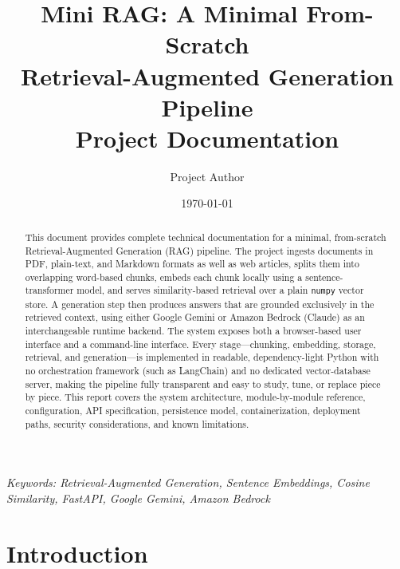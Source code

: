 \documentclass[11pt,a4paper]{article}
\title{\textbf{Mini RAG: A Minimal From-Scratch\\ Retrieval-Augmented Generation Pipeline}\\[4pt]
\large Project Documentation}
\author{Project Author}
\date{\today}
\begin{document}
\maketitle

\begin{center}
\textit{Keywords: Retrieval-Augmented Generation, Sentence Embeddings,
Cosine Similarity, FastAPI, Google Gemini, Amazon Bedrock}
\end{center}

\begin{abstract}
\noindent
This document provides complete technical documentation for a minimal,
from-scratch Retrieval-Augmented Generation (RAG) pipeline. The project
ingests documents in PDF, plain-text, and Markdown formats as well as web
articles, splits them into overlapping word-based chunks, embeds each chunk
locally using a sentence-transformer model, and serves similarity-based
retrieval over a plain \texttt{numpy} vector store. A generation step then
produces answers that are grounded exclusively in the retrieved context,
using either Google Gemini or Amazon Bedrock (Claude) as an interchangeable
runtime backend. The system exposes both a browser-based user interface and a
command-line interface. Every stage---chunking, embedding, storage,
retrieval, and generation---is implemented in readable, dependency-light
Python with no orchestration framework (such as LangChain) and no dedicated
vector-database server, making the pipeline fully transparent and easy to
study, tune, or replace piece by piece. This report covers the system
architecture, module-by-module reference, configuration, API specification,
persistence model, containerization, deployment paths, security
considerations, and known limitations.
\end{abstract}

\newpage
\tableofcontents
\newpage

\section{Introduction}
\end{document}
